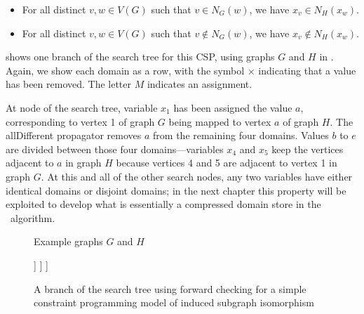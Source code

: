 \begin{itemize}
    \item For all distinct $v, w \in V(G)$ such that $v \in N_G(w)$, we have 
$x_v \in N_H(x_w)$.
\item For all distinct $v, w \in V(G)$ such that $v \not\in N_G(w)$, we have 
$x_v \not\in N_H(x_w)$.
\end{itemize}

 shows one branch of the search tree for this CSP,
using graphs $G$ and $H$ in .  Again, we show
each domain as a row, with the symbol $\times$ indicating that a value
has been removed. The letter $M$ indicates an assignment.

At node  of the search tree, variable $x_1$ has been assigned the value $a$,
corresponding to vertex 1 of graph $G$ being mapped to vertex $a$ of graph $H$. The
allDifferent propagator removes $a$ from the remaining four domains.
Values $b$ to $e$ are divided between those four domains---variables
$x_4$ and $x_5$ keep the vertices adjacent to $a$ in graph $H$ because vertices 4 and
5 are adjacent to vertex 1 in graph $G$.  At this and all of the other search
nodes, any two variables have either identical domains or disjoint domains;
in the next chapter this property will be exploited to develop what is essentially a compressed
domain store in the \McSplit\ algorithm.

\begin{figure}[h!]
\centering
\caption{Example graphs $G$ and $H$}
\label{fig:intro-G-H}
\end{figure}

\begin{figure}[h!]
\centering
\begin{forest}
[\usebox{\MCSDomainsBoxA}
  [\usebox{\MCSDomainsBoxB}
    [\usebox{\MCSDomainsBoxC}
      [\usebox{\MCSDomainsBoxD}]%
    ]
  ]
]
\end{forest}
\caption{A branch of the search tree using forward checking for a simple constraint programming model
	of induced subgraph isomorphism}
\label{fig:SipDomains}
\end{figure}

